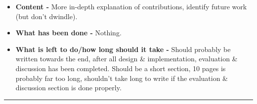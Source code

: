 \begin{itemize}
	\item \textbf{Content -} More in-depth explanation of contributions, identify future work (but don't dwindle).
	\item \textbf{What has been done -} Nothing.
	\item \textbf{What is left to do/how long should it take -} Should probably be written towards the end, after all design \& implementation, evaluation \& discussion has been completed. Should be a short section, 10 pages is probably far too long, shouldn't take long to write if the evaluation \& discussion section is done properly.
\end{itemize}

\hrule